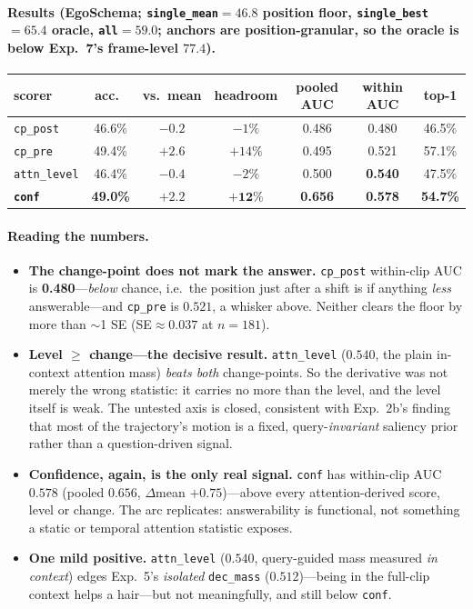 \documentclass[11pt]{article}
\begin{document}
\paragraph{Results (EgoSchema; \texttt{single\_mean}$=46.8$ position floor,
\texttt{single\_best}$=65.4$ oracle, \texttt{all}$=59.0$; anchors are position-granular, so the
oracle is below Exp.~7's frame-level $77.4$).}

\begin{center}
\begin{tabular}{lccc@{\hskip 2em}ccc}
\toprule
scorer & acc.\ & vs.\ mean & headroom & pooled AUC & within AUC & top-1 \\
\midrule
\texttt{cp\_post}   & 46.6\% & $-0.2$ & $-1\%$  & 0.486 & 0.480 & 46.5\% \\
\texttt{cp\_pre}    & 49.4\% & $+2.6$ & $+14\%$ & 0.495 & 0.521 & 57.1\% \\
\texttt{attn\_level}& 46.4\% & $-0.4$ & $-2\%$  & 0.500 & \textbf{0.540} & 47.5\% \\
\textbf{\texttt{conf}} & \textbf{49.0\%} & $\mathbf{+2.2}$ & $\mathbf{+12\%}$ & \textbf{0.656} & \textbf{0.578} & \textbf{54.7\%} \\
\bottomrule
\end{tabular}
\end{center}

\paragraph{Reading the numbers.}
\begin{itemize}
\item \textbf{The change-point does not mark the answer.} \texttt{cp\_post} within-clip AUC is
      \textbf{0.480}---\emph{below} chance, i.e.\ the position just after a shift is if anything
      \emph{less} answerable---and \texttt{cp\_pre} is $0.521$, a whisker above. Neither clears
      the floor by more than $\sim$1 SE (SE$\approx0.037$ at $n{=}181$).
\item \textbf{Level $\ge$ change---the decisive result.} \texttt{attn\_level} ($0.540$, the
      plain in-context attention mass) \emph{beats both} change-points. So the derivative was
      not merely the wrong statistic: it carries no more than the level, and the level itself is
      weak. The untested axis is closed, consistent with Exp.~2b's finding that most of the
      trajectory's motion is a fixed, query-\emph{invariant} saliency prior rather than a
      question-driven signal.
\item \textbf{Confidence, again, is the only real signal.} \texttt{conf} has within-clip AUC
      $0.578$ (pooled $0.656$, $\Delta$mean $+0.75$)---above every attention-derived score,
      level or change. The arc replicates: answerability is functional, not something a static
      or temporal attention statistic exposes.
\item \textbf{One mild positive.} \texttt{attn\_level} ($0.540$, query-guided mass measured
      \emph{in context}) edges Exp.~5's \emph{isolated} \texttt{dec\_mass} ($0.512$)---being in
      the full-clip context helps a hair---but not meaningfully, and still below \texttt{conf}.
\end{itemize}
\end{document}
